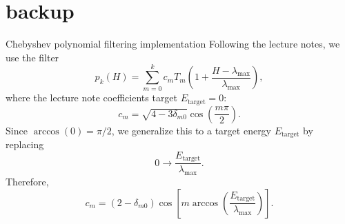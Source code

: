 \documentclass[aspectratio=169]{beamer}
\begin{document}
\appendix

\section{backup}

\begin{frame}[noframenumbering]{Chebyshev polynomial filtering implementation}
    Following the lecture notes, we use the filter
    \begin{equation}
        p_k(H)=\sum_{m=0}^{k} c_m T_m\left(1 + \frac{H - \lambda_{\max}}{\lambda_{\max}}\right),
    \end{equation}
    where the lecture note coefficients target $E_\mathrm{target}=0$:
    \begin{equation}
        c_m=\sqrt{4-3\delta_{m0}}\cos\left(\frac{m\pi}{2}\right).
    \end{equation}
    Since $\arccos(0)=\pi/2$, we generalize this to a target energy $E_\mathrm{target}$ by replacing
    \begin{equation}
        0 \rightarrow \frac{E_\mathrm{target}}{\lambda_{\max}}.
    \end{equation}
    Therefore,
    \begin{equation}
        c_m=(2-\delta_{m0}) \cos\left[m\arccos\left(\frac{E_\mathrm{target}}{\lambda_{\max}}\right)\right].
    \end{equation}
\end{frame}
\end{document}
